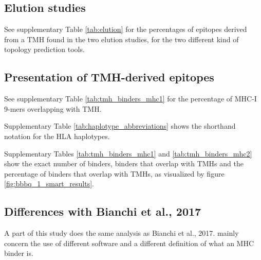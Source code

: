 \subsection{Elution studies}

See supplementary Table \ref{tab:elution} 
for the percentages of epitopes derived from a TMH 
found in the two elution studies, 
for the two different kind of topology prediction tools.



\clearpage

\subsection{Presentation of TMH-derived epitopes}

See supplementary Table \ref{tab:tmh_binders_mhc1} 
for the percentage of MHC-I 9-mers overlapping with TMH.



Supplementary Table \ref{tab:haplotype_abbreviations} shows the
shorthand notation for the HLA haplotypes.



Supplementary Tables \ref{tab:tmh_binders_mhc1} and \ref{tab:tmh_binders_mhc2}
show the exact number of binders, binders that overlap with TMHs
and the percentage of binders that overlap with TMHs, as
visualized by figure \ref{fig:bbbq_1_smart_results}.

\clearpage

\subsection{Differences with Bianchi et al., 2017}

A part of this study does the same analysis as Bianchi et al., 2017.
mainly concern the use of different
software and a different definition of what an MHC binder is.

